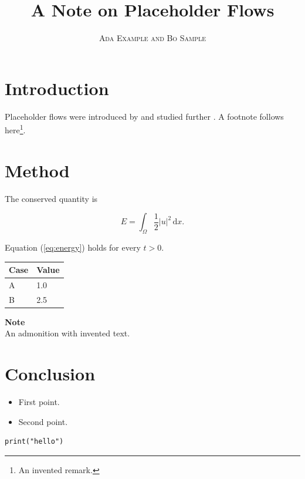 \documentclass[a4paper,11pt,oneside]{book}
\title{\Huge \textbf{A Note on Placeholder Flows}}
\author{\textsc{Ada Example and Bo Sample}}
\begin{document}
\sloppy

\frontmatter
\maketitle

\tableofcontents

\mainmatter

% 
% 

\section{Introduction}

Placeholder flows were introduced by \cite{doe2020} and studied further \citep{doe2020}.
A footnote follows here\footnote{An invented remark.}.

\section{Method}

The conserved quantity is

\begin{equation}
\label{eq:energy}
E = \int_\Omega \frac{1}{2} |u|^2 \, \mathrm{d}x .
\end{equation}

Equation (\ref{eq:energy}) holds for every $t > 0$.

\bigskip\noindent
\begin{tabular}{p{}p{}}
\toprule
Case & Value \\
\hline
A & 1.0 \\
B & 2.5 \\
\bottomrule
\end{tabular}

\bigskip

\begin{framed}
\textbf{Note}\\
An admonition with invented text.
\end{framed}

\section{Conclusion}

\begin{itemize}
\item First point.
\item Second point.
\end{itemize}

\begin{verbatim}
print("hello")
\end{verbatim}



\end{document}
